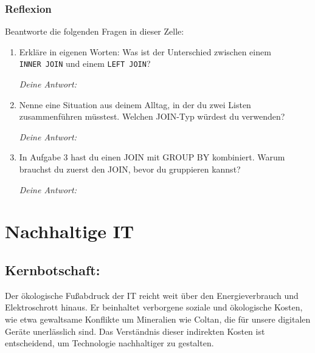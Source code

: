 \documentclass[
  nswissgerman,
  a4paper,
  DIV=11,
  numbers=noendperiod,
  ngerman]{scrreprt}
\begin{document}
\section{Reflexion}\label{reflexion-1}

Beantworte die folgenden Fragen in dieser Zelle:

\begin{enumerate}
\def\labelenumi{\arabic{enumi}.}
\item
  Erkläre in eigenen Worten: Was ist der Unterschied zwischen einem
  \texttt{INNER\ JOIN} und einem \texttt{LEFT\ JOIN}?

  \emph{Deine Antwort:}
\item
  Nenne eine Situation aus deinem Alltag, in der du zwei Listen
  zusammenführen müsstest. Welchen JOIN-Typ würdest du verwenden?

  \emph{Deine Antwort:}
\item
  In Aufgabe 3 hast du einen JOIN mit GROUP BY kombiniert. Warum
  brauchst du zuerst den JOIN, bevor du gruppieren kannst?

  \emph{Deine Antwort:}
\end{enumerate}

\part{Nachhaltige IT}

\chapter{Kernbotschaft:}\label{kernbotschaft}

\begin{tcolorbox}[enhanced jigsaw, arc=.35mm, bottomrule=.15mm, bottomtitle=1mm, breakable, colback=white, colbacktitle=quarto-callout-note-color!10!white, colframe=quarto-callout-note-color-frame, coltitle=black, left=2mm, leftrule=.75mm, opacityback=0, opacitybacktitle=0.6, rightrule=.15mm, title=\textcolor{quarto-callout-note-color}{\faInfo}\hspace{0.5em}{Hinweis}, titlerule=0mm, toprule=.15mm, toptitle=1mm]

Der ökologische Fußabdruck der IT reicht weit über den Energieverbrauch
und Elektroschrott hinaus. Er beinhaltet verborgene soziale und
ökologische Kosten, wie etwa gewaltsame Konflikte um Mineralien wie
Coltan, die für unsere digitalen Geräte unerlässlich sind. Das
Verständnis dieser indirekten Kosten ist entscheidend, um Technologie
nachhaltiger zu gestalten.

\end{tcolorbox}
\end{document}
